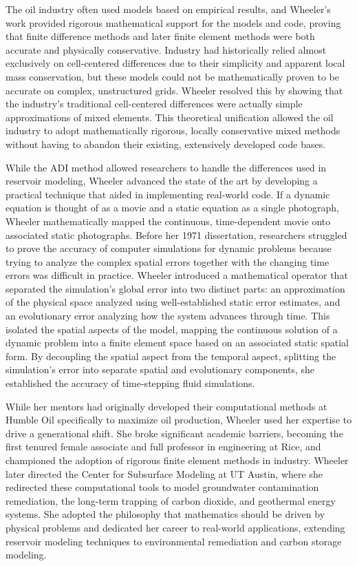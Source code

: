 The oil industry often used models based on empirical results, and Wheeler's work provided rigorous mathematical support for the models and code, proving that finite difference methods and later finite element methods were both accurate and physically conservative. Industry had historically relied almost exclusively on cell-centered differences due to their simplicity and apparent local mass conservation, but these models could not be mathematically proven to be accurate on complex, unstructured grids. Wheeler resolved this by showing that the industry's traditional cell-centered differences were actually simple approximations of mixed elements. This theoretical unification allowed the oil industry to adopt mathematically rigorous, locally conservative mixed methods without having to abandon their existing, extensively developed code bases. \cite{russellFiniteElementFinite1983} \cite{weiserConvergenceBlockCenteredFinite1988}

While the ADI method allowed researchers to handle the differences used in reservoir modeling, Wheeler advanced the state of the art by developing a practical technique that aided in implementing real-world code. If a dynamic equation is thought of as a movie and a static equation as a single photograph, Wheeler mathematically mapped the continuous, time-dependent movie onto associated static photographs. Before her 1971 dissertation, researchers struggled to prove the accuracy of computer simulations for dynamic problems because trying to analyze the complex spatial errors together with the changing time errors was difficult in practice. Wheeler introduced a mathematical operator that separated the simulation's global error into two distinct parts: an approximation of the physical space analyzed using well-established static error estimates, and an evolutionary error analyzing how the system advances through time. This isolated the spatial aspects of the model, mapping the continuous solution of a dynamic problem into a finite element space based on an associated static spatial form. By decoupling the spatial aspect from the temporal aspect, splitting the simulation's error into separate spatial and evolutionary components, she established the accuracy of time-stepping fluid simulations. 

While her mentors had originally developed their computational methods at Humble Oil specifically to maximize oil production, Wheeler used her expertise to drive a generational shift. She broke significant academic barriers, becoming the first tenured female associate and full professor in engineering at Rice, and championed the adoption of rigorous finite element methods in industry. Wheeler later directed the Center for Subsurface Modeling at UT Austin, where she redirected these computational tools to model groundwater contamination remediation, the long-term trapping of carbon dioxide, and geothermal energy systems. She adopted the philosophy that mathematics should be driven by physical problems and dedicated her career to real-world applications, extending reservoir modeling techniques to environmental remediation and carbon storage modeling. \cite{chiangModelingInsituBiorestoration1991}

